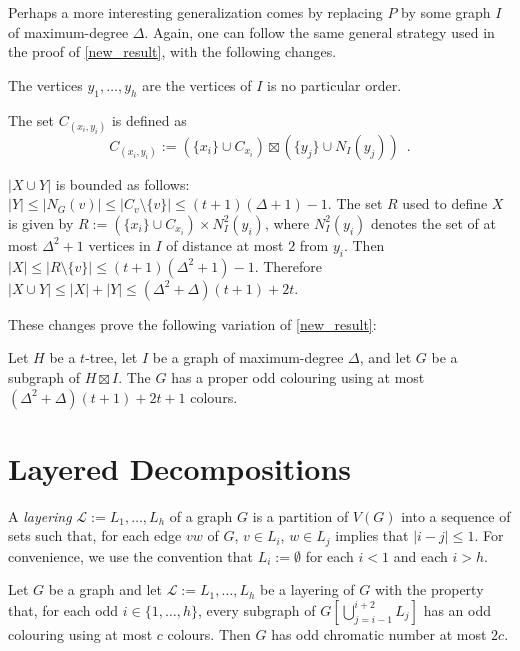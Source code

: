 \documentclass{patmorin}
\begin{document}
Perhaps a more interesting generalization comes by replacing $P$ by some graph $I$ of maximum-degree $\Delta$.  Again, one can follow the same general strategy used in the proof of \cref{new_result}, with the following changes.
\begin{compactitem}
  \item The vertices $y_1,\ldots,y_h$ are the vertices of $I$ is no particular order.
  \item The set $C_{(x_i,y_i)}$ is defined as
\[
    C_{(x_i,y_i)}:=(\{x_i\}\cup C_{x_i})\boxtimes (\{y_j\}\cup N_I(y_j)) \enspace .
\]
  \item $|X\cup Y|$ is bounded as follows: $|Y|\le|N_G(v)|\le |C_v\setminus\{v\}| \le (t+1)(\Delta+1)-1$.  The set $R$ used to define $X$ is given by $R:=(\{x_i\}\cup C_{x_i})\times N^2_I(y_i)$, where $N^2_I(y_i)$ denotes the set of at most $\Delta^2+1$ vertices in $I$ of distance at most $2$ from $y_i$.  Then $|X|\le|R\setminus\{v\}|\le (t+1)(\Delta^2+1)-1$.  Therefore $|X\cup Y|\le |X|+|Y|\le (\Delta^2+\Delta)(t+1)+2t$.
\end{compactitem}
These changes prove the following variation of \cref{new_result}:

\begin{thm}\label{new_result_delta}
  Let $H$ be a $t$-tree, let $I$ be a graph of maximum-degree $\Delta$, and let $G$ be a subgraph of $H\boxtimes I$.  The $G$ has a proper odd colouring using at most $(\Delta^2+\Delta)(t+1)+2t+1$ colours.
\end{thm}

\section{Layered Decompositions}

A \emph{layering} $\mathcal{L}:=L_1,\ldots,L_h$ of a graph $G$ is a partition of $V(G)$ into a sequence of sets such that, for each edge $vw$ of $G$, $v\in L_i$, $w\in L_j$ implies that $|i-j|\le 1$.  For convenience, we use the convention that $L_i:=\emptyset$ for each $i < 1$ and each $i> h$.

\begin{lem}\label{four_layer}
  Let $G$ be a graph and let $\mathcal{L}:=L_1,\ldots,L_h$ be a layering of $G$ with the property that, for each odd $i\in\{1,\ldots,h\}$, every subgraph of $G[\bigcup_{j=i-1}^{i+2}L_{j}]$ has an odd colouring using at most $c$ colours. Then $G$ has odd chromatic number at most $2c$.
\end{lem}
\end{document}
